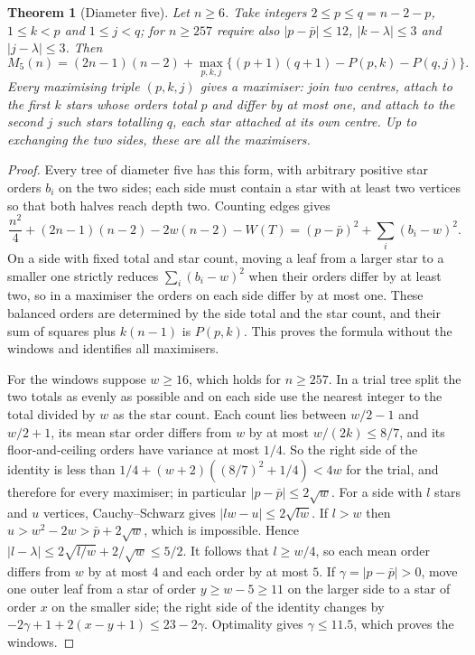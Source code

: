 \documentclass[11pt,a4paper]{article}
\newtheorem{theorem}{Theorem}[section]
\theoremstyle{remark}
\begin{document}
\begin{theorem}[Diameter five]\label{five}
Let $n\ge6$. Take integers $2\le p\le q=n-2-p$, $1\le k<p$ and $1\le j<q$; for $n\ge257$ require also $|p-\bar p|\le12$, $|k-\lambda|\le3$ and $|j-\lambda|\le3$. Then
\[
 M_5(n)=(2n-1)(n-2)+\max_{p,k,j}\{(p+1)(q+1)-P(p,k)-P(q,j)\}.
\]
Every maximising triple $(p,k,j)$ gives a maximiser: join two centres, attach to the first $k$ stars whose orders total $p$ and differ by at most one, and attach to the second $j$ such stars totalling $q$, each star attached at its own centre. Up to exchanging the two sides, these are all the maximisers.
\end{theorem}
\begin{proof}
Every tree of diameter five has this form, with arbitrary positive star orders $b_i$ on the two sides; each side must contain a star with at least two vertices so that both halves reach depth two. Counting edges gives
\[
 \frac{n^2}{4}+(2n-1)(n-2)-2w(n-2)-W(T)=(p-\bar p)^2+\sum_i(b_i-w)^2 .
\]
On a side with fixed total and star count, moving a leaf from a larger star to a smaller one strictly reduces $\sum_i(b_i-w)^2$ when their orders differ by at least two, so in a maximiser the orders on each side differ by at most one. These balanced orders are determined by the side total and the star count, and their sum of squares plus $k(n-1)$ is $P(p,k)$. This proves the formula without the windows and identifies all maximisers.

For the windows suppose $w\ge16$, which holds for $n\ge257$. In a trial tree split the two totals as evenly as possible and on each side use the nearest integer to the total divided by $w$ as the star count. Each count lies between $w/2-1$ and $w/2+1$, its mean star order differs from $w$ by at most $w/(2k)\le8/7$, and its floor-and-ceiling orders have variance at most $1/4$. So the right side of the identity is less than $1/4+(w+2)((8/7)^2+1/4)<4w$ for the trial, and therefore for every maximiser; in particular $|p-\bar p|\le2\sqrt w$. For a side with $l$ stars and $u$ vertices, Cauchy--Schwarz gives $|lw-u|\le2\sqrt{lw}$. If $l>w$ then $u>w^2-2w>\bar p+2\sqrt w$, which is impossible. Hence $|l-\lambda|\le2\sqrt{l/w}+2/\sqrt w\le5/2$. It follows that $l\ge w/4$, so each mean order differs from $w$ by at most $4$ and each order by at most $5$. If $\gamma=|p-\bar p|>0$, move one outer leaf from a star of order $y\ge w-5\ge11$ on the larger side to a star of order $x$ on the smaller side; the right side of the identity changes by $-2\gamma+1+2(x-y+1)\le23-2\gamma$. Optimality gives $\gamma\le11.5$, which proves the windows.
\end{proof}
\end{document}
